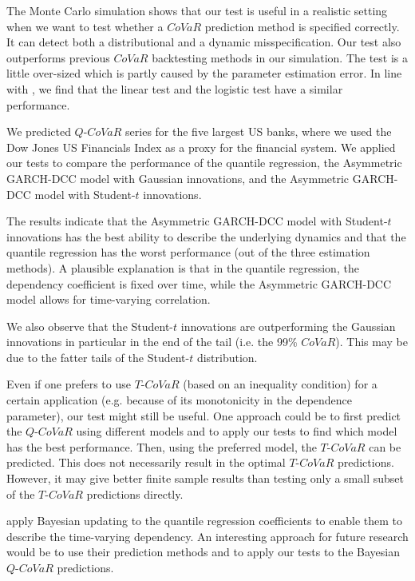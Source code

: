 \documentclass[12pt]{article}
\begin{document}
The Monte Carlo simulation shows that our test is useful in a realistic setting when we want to test whether a $CoVaR$ prediction method is specified correctly. It can detect both a distributional and a dynamic misspecification. Our test also outperforms previous $CoVaR$ backtesting methods in our simulation. The test is a little over-sized which is partly caused by the parameter estimation error. In line with \citet{nonlineartest}, we find that the linear test and the logistic test have a similar performance.

We predicted $Q$-$CoVaR$ series for the five largest US banks, where we used the Dow Jones US Financials Index as a proxy for the financial system.  We applied our tests to compare the performance of the quantile regression, the Asymmetric GARCH-DCC model with Gaussian innovations, and the Asymmetric GARCH-DCC model with Student-$t$ innovations.

The results indicate that the Asymmetric GARCH-DCC model with Student-$t$ innovations has the best ability to describe the underlying dynamics and that the quantile regression has the worst performance (out of the three estimation methods). A plausible explanation is that in the quantile regression, the dependency coefficient is fixed over time, while the Asymmetric GARCH-DCC model allows for time-varying correlation.

We also observe that the Student-$t$ innovations are outperforming the Gaussian innovations in particular in the end of the tail (i.e. the 99\% $CoVaR$). This may be due to the fatter tails of the Student-$t$ distribution.

Even if one prefers to use $T$-$CoVaR$ (based on an inequality condition) for a certain application (e.g. because of its monotonicity in the dependence parameter), our test might still be useful. One approach could be to first predict the $Q$-$CoVaR$ using different models and to apply our tests to find which model has the best performance. Then, using the preferred model, the $T$-$CoVaR$ can be predicted. This does not necessarily result in the optimal $T$-$CoVaR$ predictions. However, it may give better finite sample results than testing only a small subset of the $T$-$CoVaR$ predictions directly.

\citet{bayesian} apply Bayesian updating to the quantile regression coefficients to enable them to describe the time-varying dependency. An interesting approach for future research would be to use their prediction methods and to apply our tests to the Bayesian $Q$-$CoVaR$ predictions.
\end{document}
